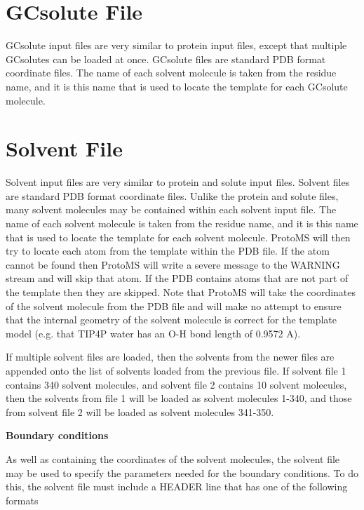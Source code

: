 \documentclass[letterpaper,10pt,english]{sphinxmanual}
\begin{document}
\section{GCsolute File}
\label{protoms:gcpdb}\label{protoms:gcsolute-file}
GCsolute input files are very similar to protein input files, except that multiple GCsolutes can be loaded at once. GCsolute files are standard PDB format coordinate files. The name of each solvent molecule is taken from the residue name, and it is this name that is used to locate the template for each GCsolute molecule.


\section{Solvent File}
\label{protoms:solvent-file}\label{protoms:solventpdb}
Solvent input files are very similar to protein and solute input files. Solvent files are standard PDB format coordinate files. Unlike the protein and solute files, many solvent molecules may be contained within each solvent input file. The name of each solvent molecule is taken from the residue name, and it is this name that is used to locate the template for each solvent molecule. ProtoMS will then try to locate each atom from the template within the PDB file. If the atom cannot be found then ProtoMS will write a severe message to the WARNING stream and will skip that atom. If the PDB contains atoms that are not part of the template then they are skipped. Note that ProtoMS will take the coordinates of the solvent molecule from the PDB file and will make no attempt to ensure that the internal geometry of the solvent molecule is correct for the template model (e.g. that
TIP4P water has an O-H bond length of 0.9572 A).

If multiple solvent files are loaded, then the solvents from the newer files are appended onto the list of solvents loaded from the previous file. If solvent file 1 contains 340 solvent molecules, and solvent file 2 contains 10 solvent molecules, then the solvents from file 1 will be loaded as solvent molecules 1-340, and those from solvent file 2 will be loaded as solvent molecules 341-350.

\textbf{Boundary conditions}

As well as containing the coordinates of the solvent molecules, the solvent file may be used to specify the parameters needed for the boundary conditions. To do this, the solvent file must include a HEADER line that has one of the following formats
\end{document}
